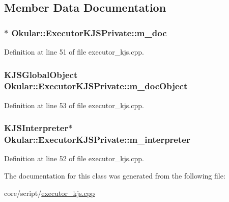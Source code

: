 \subsection{Member Data Documentation}
\hypertarget{classOkular_1_1ExecutorKJSPrivate_acad3df06880e02e5c64b48f40a63438c}{
\subsubsection[{m\+\_\+doc}]{$\ast$ Okular\+::\+Executor\+K\+J\+S\+Private\+::m\+\_\+doc}}\label{classOkular_1_1ExecutorKJSPrivate_acad3df06880e02e5c64b48f40a63438c}


Definition at line 51 of file executor\+\_\+kjs.\+cpp.

\hypertarget{classOkular_1_1ExecutorKJSPrivate_a37b97b1e212263d57d46eabf7ab21a67}{
\subsubsection[{m\+\_\+doc\+Object}]{\setlength{\rightskip}{0pt plus 5cm}K\+J\+S\+Global\+Object Okular\+::\+Executor\+K\+J\+S\+Private\+::m\+\_\+doc\+Object}}\label{classOkular_1_1ExecutorKJSPrivate_a37b97b1e212263d57d46eabf7ab21a67}


Definition at line 53 of file executor\+\_\+kjs.\+cpp.

\hypertarget{classOkular_1_1ExecutorKJSPrivate_aab3d209d83b8336b64fd8af397dff44c}{
\subsubsection[{m\+\_\+interpreter}]{\setlength{\rightskip}{0pt plus 5cm}K\+J\+S\+Interpreter$\ast$ Okular\+::\+Executor\+K\+J\+S\+Private\+::m\+\_\+interpreter}}\label{classOkular_1_1ExecutorKJSPrivate_aab3d209d83b8336b64fd8af397dff44c}


Definition at line 52 of file executor\+\_\+kjs.\+cpp.



The documentation for this class was generated from the following file\+:\begin{DoxyCompactItemize}
\item 
core/script/\hyperlink{executor__kjs_8cpp}{executor\+\_\+kjs.\+cpp}\end{DoxyCompactItemize}
